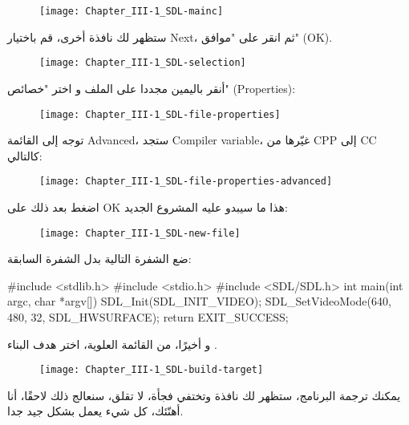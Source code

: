 \begin{tcolorbox}[breakable,title=ملاحظات مترجمة الكتاب, colback=orange!20, colframe=orange!70, fontupper=\footnotesize, coltitle=white, fonttitle=\normalsize, attach title]
\begin{figure}[H]
	\centering
	\texttt{[image: Chapter\_III-1\_SDL-mainc]}
\end{figure}

ستظهر لك نافذة أخرى، قم باختيار
\textenglish{Next}،
ثم انقر على "موافق"
(\textenglish{OK}).

\begin{figure}[H]
	\centering
	\texttt{[image: Chapter\_III-1\_SDL-selection]}
\end{figure}

أنقر باليمين مجددا على الملف 
و اختر "خصائص" 
(\textenglish{Properties}):

\begin{figure}[H]
	\centering
	\texttt{[image: Chapter\_III-1\_SDL-file-properties]}
\end{figure}

توجه إلى القائمة
\textenglish{Advanced}،
ستجد
\textenglish{Compiler variable}،
غيّرها من
\textenglish{CPP}
إلى
\textenglish{CC}
كالتالي:

\begin{figure}[H]
	\centering
	\texttt{[image: Chapter\_III-1\_SDL-file-properties-advanced]}
\end{figure}

اضغط بعد ذلك على
\textenglish{OK}
هذا ما سيبدو عليه المشروع الجديد:

\begin{figure}[H]
	\centering
	\texttt{[image: Chapter\_III-1\_SDL-new-file]}
\end{figure}

ضع الشفرة التالية بدل الشفرة السابقة:

\begin{Csource}
#include <stdlib.h> 
#include <stdio.h> 
#include <SDL/SDL.h>
int main(int argc, char *argv[]) 
{ 
	SDL_Init(SDL_INIT_VIDEO); 
	SDL_SetVideoMode(640, 480, 32, SDL_HWSURFACE); 
	return EXIT_SUCCESS; 
}
\end{Csource}

و أخيرًا، من القائمة العلوية، اختر هدف البناء 
.

\begin{figure}[H]
	\centering
	\texttt{[image: Chapter\_III-1\_SDL-build-target]}
\end{figure}


يمكنك ترجمة البرنامج، ستظهر لك نافذة وتختفي فجأة، لا تقلق، سنعالج ذلك لاحقًا، أنا أهنّئك، كل شيء يعمل بشكل جيد جدا.

\end{tcolorbox}

